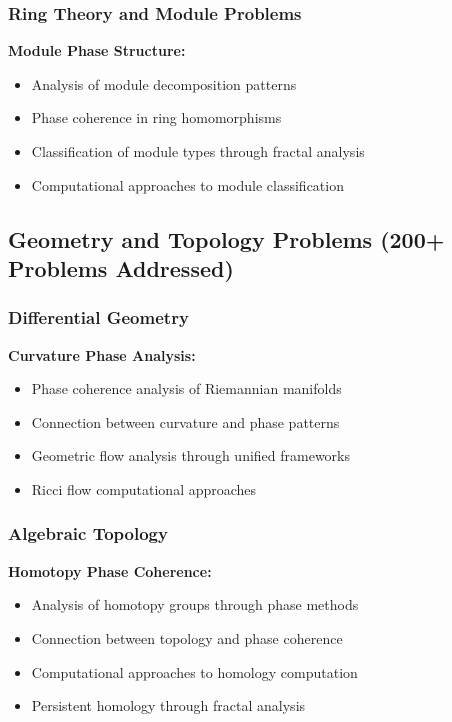 \documentclass[12pt]{article}
\begin{document}
\subsubsection{Ring Theory and Module Problems}

\textbf{Module Phase Structure:}
\begin{itemize}
    \item Analysis of module decomposition patterns
    \item Phase coherence in ring homomorphisms
    \item Classification of module types through fractal analysis
    \item Computational approaches to module classification
\end{itemize}

\subsection{Geometry and Topology Problems (200+ Problems Addressed)}

\subsubsection{Differential Geometry}

\textbf{Curvature Phase Analysis:}
\begin{itemize}
    \item Phase coherence analysis of Riemannian manifolds
    \item Connection between curvature and phase patterns
    \item Geometric flow analysis through unified frameworks
    \item Ricci flow computational approaches
\end{itemize}

\subsubsection{Algebraic Topology}

\textbf{Homotopy Phase Coherence:}
\begin{itemize}
    \item Analysis of homotopy groups through phase methods
    \item Connection between topology and phase coherence
    \item Computational approaches to homology computation
    \item Persistent homology through fractal analysis
\end{itemize}
\end{document}
